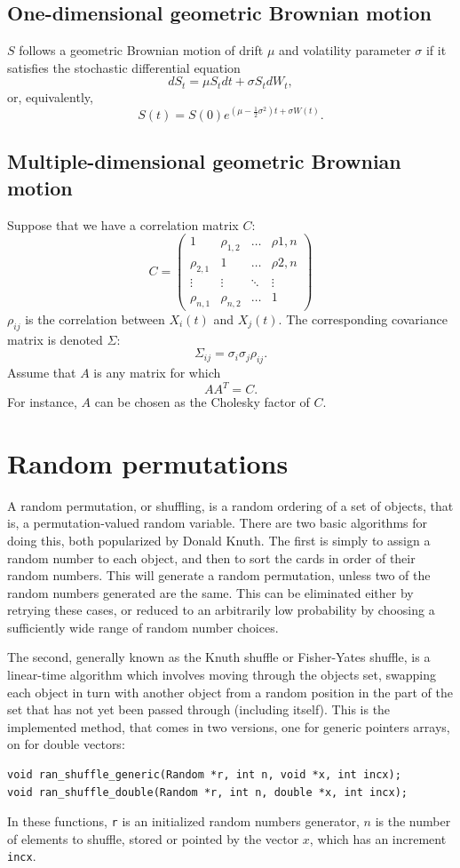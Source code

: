 \subsection{One-dimensional geometric Brownian motion}

$S$ follows a geometric Brownian motion of drift $\mu$ and volatility parameter $\sigma$ if it satisfies the stochastic differential equation
\[
dS_t = \mu S_t dt + \sigma S_t dW_t,
\]
or, equivalently,
\[
S(t) = S(0)e^{(\mu-\frac{1}{2}\sigma^2)t+\sigma W(t)}.
\]

\subsection{Multiple-dimensional geometric Brownian motion}

Suppose that we have a correlation matrix $C$:
\[
C =
\begin{pmatrix}
1 & \rho_{1,2} & \ldots & \rho{1,n} \\
\rho_{2,1} & 1 & \ldots & \rho{2,n} \\
\vdots & \vdots & \ddots & \vdots \\
\rho_{n,1} & \rho_{n,2} & \ldots & 1
\end{pmatrix}
\]
$\rho_{ij}$ is the correlation between $X_i(t)$ and $X_j(t)$.
The corresponding covariance matrix is denoted $\Sigma$:
\[
\Sigma_{ij} = \sigma_i \sigma_j \rho_{ij}.
\]
Assume that $A$ is any matrix for which
\[
AA^T = C.
\]
For instance, $A$ can be chosen as the Cholesky factor of $C$.

\section{Random permutations}

A random permutation, or
shuffling, is a random ordering of a
set of objects, that is, a permutation-valued random variable.
There are two basic algorithms for doing this, both popularized by
Donald Knuth.
The first is simply to assign a random number to each object, and then
to sort the cards in order of their random numbers. This will generate
a random permutation, unless two of the random numbers generated are
the same. This can be eliminated either by retrying these cases, or
reduced to an arbitrarily low probability by choosing a sufficiently
wide range of random number choices.

The second, generally known as the Knuth shuffle or Fisher-Yates
shuffle, is a linear-time algorithm which involves moving through the
objects set, swapping each object in turn with another object from a
random position in the part of the set that has not yet been passed
through (including itself).
This is the implemented method, that comes in two versions, one for
generic pointers arrays, on for double vectors:
\begin{verbatim}
void ran_shuffle_generic(Random *r, int n, void *x, int incx);
void ran_shuffle_double(Random *r, int n, double *x, int incx);
\end{verbatim}
In these functions, \verb|r| is an initialized random numbers
generator, $n$ is the number of elements to shuffle, stored or pointed
by the vector $x$, which has an increment \verb|incx|.

